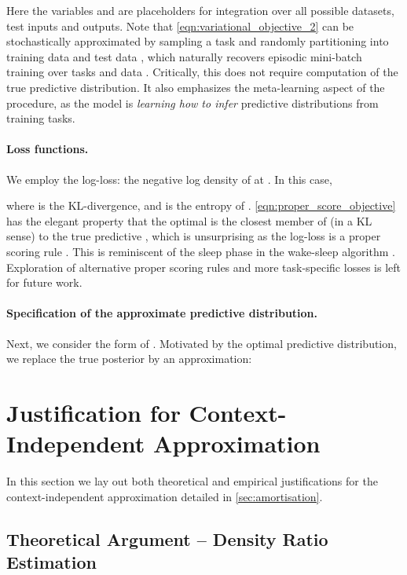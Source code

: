 \documentclass{article}
\begin{document}
Here the variables  and  are placeholders for integration over all possible datasets, test inputs and outputs. Note that \cref{eqn:variational_objective_2} can be stochastically approximated by sampling a task  and randomly partitioning into training data  and test data , which naturally recovers episodic mini-batch training over tasks and data \citep{vinyals2016matching,ravi2016optimization}. Critically, this does not require computation of the true predictive distribution. It also emphasizes the meta-learning aspect of the procedure, as the model is \textit{learning how to infer} predictive distributions from training tasks. 

\paragraph{Loss functions.} We employ the log-loss: the negative log density of  at . In this case,

where  is the KL-divergence, and  is the entropy of . 
\cref{eqn:proper_score_objective} has the elegant property that the optimal  is the closest member of  (in a KL sense) to the true predictive , which is unsurprising as the log-loss is a proper scoring rule \citep{huszar2013scoring}. This is reminiscent of the sleep phase in the wake-sleep algorithm \citep{hinton1995wake}. Exploration of alternative proper scoring rules \citep{dawid2007geometry} and more task-specific losses \citep{lacoste2011approximate} is left for future work.

\paragraph{Specification of the approximate predictive distribution.} Next, we consider the form of . Motivated by the optimal predictive distribution, we replace the true posterior by an approximation:




\section{Justification for Context-Independent Approximation}
\label{app:empirical_justification}
\setcounter{figure}{0}   
\setcounter{table}{0}
\setcounter{equation}{0}

In this section we lay out both theoretical and empirical justifications for the context-independent approximation detailed in \cref{sec:amortisation}.

\subsection{Theoretical Argument -- Density Ratio Estimation}
\end{document}
